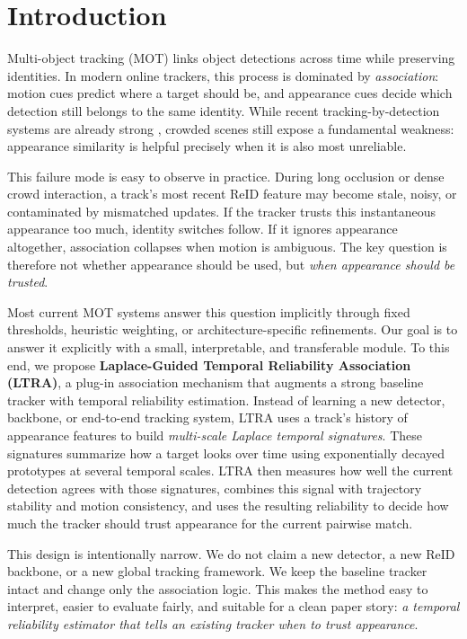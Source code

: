 \section{Introduction}
Multi-object tracking (MOT) links object detections across time while preserving identities. In modern online trackers, this process is dominated by \emph{association}: motion cues predict where a target should be, and appearance cues decide which detection still belongs to the same identity. While recent tracking-by-detection systems are already strong \cite{zhang2021bytetrack,cao2022ocsort,aharon2022botsort,du2022strongsort}, crowded scenes still expose a fundamental weakness: appearance similarity is helpful precisely when it is also most unreliable.

This failure mode is easy to observe in practice. During long occlusion or dense crowd interaction, a track's most recent ReID feature may become stale, noisy, or contaminated by mismatched updates. If the tracker trusts this instantaneous appearance too much, identity switches follow. If it ignores appearance altogether, association collapses when motion is ambiguous. The key question is therefore not whether appearance should be used, but \emph{when appearance should be trusted}.

Most current MOT systems answer this question implicitly through fixed thresholds, heuristic weighting, or architecture-specific refinements. Our goal is to answer it explicitly with a small, interpretable, and transferable module. To this end, we propose \textbf{Laplace-Guided Temporal Reliability Association (LTRA)}, a plug-in association mechanism that augments a strong baseline tracker with temporal reliability estimation. Instead of learning a new detector, backbone, or end-to-end tracking system, LTRA uses a track's history of appearance features to build \emph{multi-scale Laplace temporal signatures}. These signatures summarize how a target looks over time using exponentially decayed prototypes at several temporal scales. LTRA then measures how well the current detection agrees with those signatures, combines this signal with trajectory stability and motion consistency, and uses the resulting reliability to decide how much the tracker should trust appearance for the current pairwise match.

This design is intentionally narrow. We do not claim a new detector, a new ReID backbone, or a new global tracking framework. We keep the baseline tracker intact and change only the association logic. This makes the method easy to interpret, easier to evaluate fairly, and suitable for a clean paper story: \emph{a temporal reliability estimator that tells an existing tracker when to trust appearance}.


